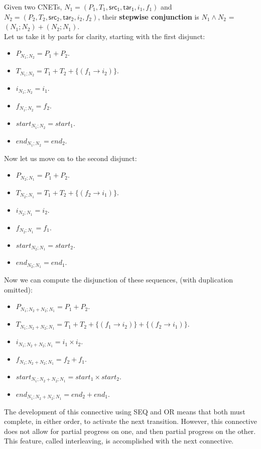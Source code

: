 \begin{definition}
  \label{def:STEP-AND-PN}
  Given two CNETs, $N_1= (P_1, T_1, \mathsf{src_1}, \mathsf{tar_1}, i_1, f_1)$ and $N_2= (P_2, T_2, \mathsf{src_2}, \mathsf{tar_2}, i_2, f_2)$, their \textbf{stepwise conjunction} is $N_1 \wedge N_2$ = $(N_1 ; N_2) + (N_2 ; N_1)$. \\
Let us take it by parts for clarity, starting with the first disjunct:
\begin{itemize}
 \item $P_{N_1;N_2} = P_1 + P_2.$
 \item $T_{N_1;N_2} = T_1 + T_2 + \{(f_1 \to i_2)\}$.
 \item $i_{N_1;N_2} = i_1$.
 \item $f_{N_1;N_2} = f_2$.
 \item $start_{N_1;N_2} = start_1.$
 \item $end_{N_1;N_2} = end_2. $
\end{itemize} 
Now let us move on to the second disjunct:
\begin{itemize}
 \item $P_{N_2;N_1} = P_1 + P_2.$
 \item $T_{N_2;N_1} = T_1 + T_2 + \{(f_2 \to i_1)\}$.
 \item $i_{N_2;N_1} = i_2$.
 \item $f_{N_2;N_1} = f_1$.
 \item $start_{N_2;N_1} = start_2.$
 \item $end_{N_2;N_1} = end_1. $
\end{itemize} 
Now we can compute the disjunction of these sequences, (with duplication omitted):
\begin{itemize}
 \item $P_{N_1;N_2 + N_2;N_1} = P_1 + P_2.$
 \item $T_{N_1;N_2 + N_2;N_1} = T_1 + T_2 + \{(f_1 \to i_2)\} + \{(f_2 \to i_1)\}$.
 \item $i_{N_1;N_2 + N_2;N_1} = i_1 \times i_2$.
 \item $f_{N_1;N_2 + N_2;N_1} = f_2 + f_1$.
 \item $start_{N_1;N_2 + N_2;N_1} = start_1 \times start_2.$
 \item $end_{N_1;N_2 + N_2;N_1} = end_2 + end_1. $
\end{itemize} 
The development of this connective using SEQ and OR means that both must complete, in either order, to activate the next transition. However, this connective does not allow for partial progress on one, and then partial progress on the other. This feature, called interleaving, is accomplished with the next connective.
\end{definition}

